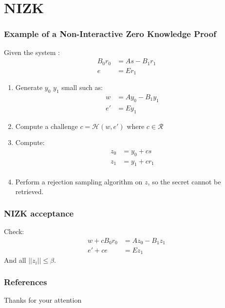 \documentclass[presentation]{beamer}
\begin{document}
\section{NIZK}
\begin{frame}[label=non-interactive-zero-knowledge-proof]
  \frametitle{Example of a Non-Interactive Zero Knowledge Proof}

  Given the system \cite{nizk}:
  \begin{equation*}
    \begin{array}{rl}
      B_0r_0 &= As - B_1r_1 \\
      e &= E r_1
    \end{array}
  \end{equation*}

  \begin{enumerate}
    \item Generate $y_0$ $y_1$ small such as:
      \begin{equation*}
        \begin{array}{rl}
          w  &= Ay_0 - B_1y_1 \\
          e' &= E y_1
        \end{array}
      \end{equation*}
    \item Compute a challenge $c = \mathcal H (w, e')$ where
      $c \in \mathcal R$
    \item Compute:
      \begin{equation*}
        \begin{array}{rl}
          z_0 &= y_0 + cs \\
          z_1 &= y_1 + cr_1 \\
        \end{array}
      \end{equation*}
    \item Perform a rejection sampling algorithm on $z$, 
      so the secret cannot be retrieved.
  \end{enumerate}
\end{frame}

\begin{frame}
  \frametitle{NIZK acceptance}

  Check:
  \begin{equation*}
    \begin{array}{rl}
      w + cB_0r_0 &= Az_0 - B_1z_1 \\
      e' + ce &= E z_1
    \end{array}
  \end{equation*}
  And all $||z_i|| \leq \beta$.
\end{frame}

\begin{frame}[allowframebreaks]
  \frametitle{References}
  Thanks for your attention
  
  
\end{frame}
\end{document}
